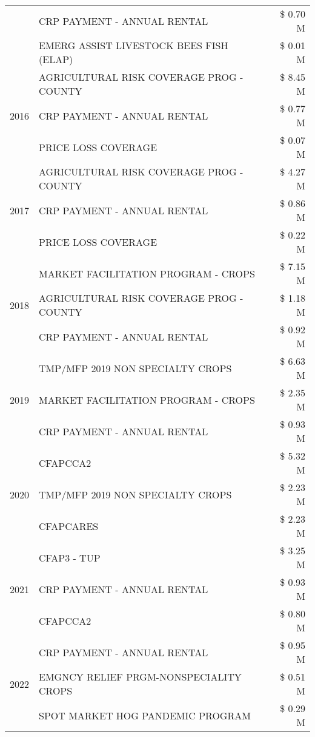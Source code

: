 \begin{tabular}{llr}
 & CRP PAYMENT - ANNUAL RENTAL & \$ 0.70 M \\
 & EMERG ASSIST LIVESTOCK BEES FISH (ELAP) & \$ 0.01 M \\
\cline{1-3}
\multirow[t]{3}{*}{2016} & AGRICULTURAL RISK COVERAGE PROG - COUNTY & \$ 8.45 M \\
 & CRP PAYMENT - ANNUAL RENTAL & \$ 0.77 M \\
 & PRICE LOSS COVERAGE & \$ 0.07 M \\
\cline{1-3}
\multirow[t]{3}{*}{2017} & AGRICULTURAL RISK COVERAGE PROG - COUNTY & \$ 4.27 M \\
 & CRP PAYMENT - ANNUAL RENTAL & \$ 0.86 M \\
 & PRICE LOSS COVERAGE & \$ 0.22 M \\
\cline{1-3}
\multirow[t]{3}{*}{2018} & MARKET FACILITATION PROGRAM - CROPS & \$ 7.15 M \\
 & AGRICULTURAL RISK COVERAGE PROG - COUNTY & \$ 1.18 M \\
 & CRP PAYMENT - ANNUAL RENTAL & \$ 0.92 M \\
\cline{1-3}
\multirow[t]{3}{*}{2019} & TMP/MFP 2019 NON SPECIALTY CROPS & \$ 6.63 M \\
 & MARKET FACILITATION PROGRAM - CROPS & \$ 2.35 M \\
 & CRP PAYMENT - ANNUAL RENTAL & \$ 0.93 M \\
\cline{1-3}
\multirow[t]{3}{*}{2020} & CFAPCCA2 & \$ 5.32 M \\
 & TMP/MFP 2019 NON SPECIALTY CROPS & \$ 2.23 M \\
 & CFAPCARES & \$ 2.23 M \\
\cline{1-3}
\multirow[t]{3}{*}{2021} & CFAP3 - TUP & \$ 3.25 M \\
 & CRP PAYMENT - ANNUAL RENTAL & \$ 0.93 M \\
 & CFAPCCA2 & \$ 0.80 M \\
\cline{1-3}
\multirow[t]{3}{*}{2022} & CRP PAYMENT - ANNUAL RENTAL & \$ 0.95 M \\
 & EMGNCY RELIEF PRGM-NONSPECIALITY CROPS & \$ 0.51 M \\
 & SPOT MARKET HOG PANDEMIC PROGRAM & \$ 0.29 M \\
\cline{1-3}
\bottomrule
\end{tabular}
